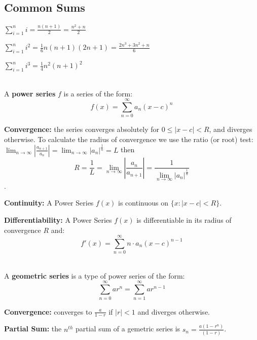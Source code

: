 \documentclass[8pt,a4paper]{extarticle}     %
\theoremstyle{definition}
\theoremstyle{definition}
\theoremstyle{definition}
\begin{document}
\begin{multicols}{4}
\subsection{Common Sums}
\begin{eqlist}
	\item $\sum_{i=1}^n i = \frac{n(n+1)}{2} = \frac{n^2+n}{2}$
	\item $\sum_{i=1}^n i^2 = \frac{1}{6} n(n+1)(2n+1) = \frac{2n^3+3n^2+n}{6}$
	\item $\sum_{i=1}^n i^3 = \frac{1}{4} n^2(n+1)^2$
\end{eqlist}
\begin{boxdefinition} \ \\ 
	A \textbf{power series} $f$ is a series of the form:
	$$f(x) = \sum_{n=0}^\infty a_n(x-c)^n$$
	\begin{bulletlist}
		\item \textbf{Convergence:} the series converges absolutely for $0\leq|x-c|<R$, and diverges otherwise. To calculate the radius of convergence we use the ratio (or root) test: $\lim_{n\to\infty}\left|\frac{a_{n+1}}{a_n}\right| = \lim_{n\to\infty} \left|a_n\right|^\frac{1}{n} = L$ then $$R = \frac{1}{L} = \lim_{n\to\infty}\left|\frac{a_n}{a_{n+1}}\right| = \frac{1}{\lim_{n\to\infty}\left|a_n\right|^\frac{1}{n}} $$.
	\end{bulletlist} 
\end{boxdefinition}

\begin{eqlist}
	\item \textbf{Continuity:} A Power Series $f(x)$ is continuous on $\{x: |x-c| < R\}$. 
	\item \textbf{Differentiability:} A Power Series $f(x)$ is differentiable in its radius of convergence $R$ and:
	$$f'(x) = \sum_{n=0}^\infty n\cdot a_n(x-c)^{n-1}$$
\end{eqlist}

\begin{boxdefinition} \ \\ 
	A \textbf{geometric series} is a type of power series of the form:
	$$\sum_{n=0}^\infty ar^n = \sum_{n=1}^\infty ar^{n-1}$$
	\begin{bulletlist}
		\item \textbf{Convergence:} converges to $\frac{a}{1-r}$ if $|r|<1$ and diverges otherwise. 
		\item \textbf{Partial Sum:} the $n^{th}$ partial sum of a gemetric series is $s_n=\frac{a(1-r^n)}{(1-r)}$. 
	\end{bulletlist} 
\end{boxdefinition}


\end{multicols}
\end{document}
